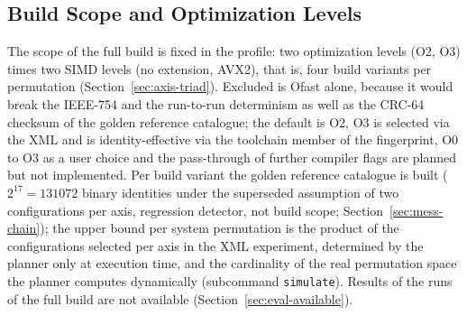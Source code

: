 \begin{nurkurz}
\subsection{Build Scope and Optimization Levels}\label{sec:eval-build-scope}
The scope of the full build is fixed in the profile: two optimization levels (O2, O3) times two SIMD levels
(no extension, AVX2), that is, four build variants per permutation (Section~\ref{sec:axis-triad}). Excluded
is Ofast alone, because it would break the IEEE-754 and the run-to-run determinism as well as the CRC-64
checksum of the golden reference catalogue; the default is O2, O3 is selected via the XML and is
identity-effective via the toolchain member of the fingerprint, O0 to O3 as a user choice and the
pass-through of further compiler flags are planned but not implemented. Per build variant the golden
reference catalogue is built ($2^{17} = 131072$ binary identities under the superseded assumption of two
configurations per axis, regression detector, not build scope; Section~\ref{sec:mess-chain}); the upper
bound per system permutation is the product of the configurations selected per axis in the XML experiment,
determined by the planner only at execution time, and the cardinality of the real permutation space the
planner computes dynamically (subcommand \texttt{simulate}).
Results of the runs of the full build are not available (Section~\ref{sec:eval-available}).
\end{nurkurz}

